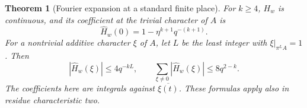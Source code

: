 \documentclass[a4paper,11pt]{article}
\newtheorem{theorem}[proposition]{Theorem}
\theoremstyle{definition}
\theoremstyle{remark}
\numberwithin{equation}{section}
\begin{document}
\begin{theorem}[Fourier expansion at a standard finite place]\leavevmode
\label{thm:terminalfourier877}
For \(k\ge4\), \(H_w\) is continuous, and its coefficient at the
trivial character of \(A\) is
\begin{equation}
         \widehat H_w(0)=1-\eta^{k+1}q^{-(k+1)} .
 \label{eq:terminalmean877}
\end{equation}
For a nontrivial additive character \(\xi\) of \(A\), let \(L\)
be the least integer with \(\xi|_{\pi^L A}=1\). Then
\begin{equation}
       |\widehat H_w(\xi)|\le 4q^{-kL},\qquad
       \sum_{\xi\ne0}|\widehat H_w(\xi)|\le8q^{2-k}.
 \label{eq:terminalfourier877}
\end{equation}
The coefficients here are integrals against \(\overline{\xi(t)}\).
These formulas apply also in residue characteristic two.
\end{theorem}
\end{document}
